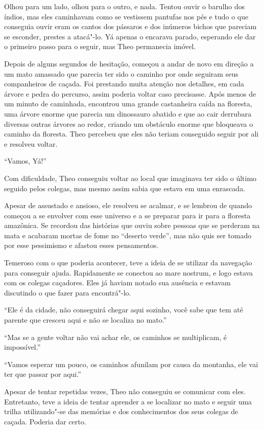 Olhou para um lado, olhou para o outro, e nada. Tentou ouvir o barulho
dos índios, mas eles caminhavam como se vestissem pantufas nos pés e
tudo o que conseguia ouvir eram os cantos dos pássaros e dos inúmeros
bichos que pareciam se esconder, prestes a atacá"-lo. Yá apenas o
encarava parado, esperando ele dar o primeiro passo para o seguir, mas
Theo permanecia imóvel.

Depois de alguns segundos de hesitação, começou a andar de novo em
direção a um mato amassado que parecia ter sido o caminho por onde
seguiram seus companheiros de caçada. Foi prestando muita atenção nos
detalhes, em cada árvore e pedra do percurso, assim poderia voltar caso
precisasse. Após menos de um minuto de caminhada, encontrou uma grande
castanheira caída na floresta, uma árvore enorme que parecia um
dinossauro abatido e que ao cair derrubara diversas outras árvores ao
redor, criando um obstáculo enorme que bloqueava o caminho da floresta.
Theo percebeu que eles não teriam conseguido seguir por ali e resolveu
voltar.

``Vamos, Yá!''

Com dificuldade, Theo conseguiu voltar ao local que imaginava ter sido o
último seguido pelos colegas, mas mesmo assim sabia que estava em uma
enrascada.

Apesar de assustado e ansioso, ele resolveu se acalmar, e se lembrou de
quando começou a se envolver com esse universo e a se preparar para ir
para a floresta amazônica. Se recordou das histórias que ouviu sobre
pessoas que se perderam na mata e acabaram mortas de fome no ``deserto
verde'', mas não quis ser tomado por esse pessimismo e afastou esses
pensamentos.

Temeroso com o que poderia acontecer, teve a ideia de se utilizar da
navegação para conseguir ajuda. Rapidamente se conectou ao mare nostrum,
e logo estava com os colegas caçadores. Eles já haviam notado sua
ausência e estavam discutindo o que fazer para encontrá"-lo.

``Ele é da cidade, não conseguirá chegar aqui sozinho, você sabe que tem
até parente que cresceu aqui e não se localiza no mato.''

``Mas se a gente voltar não vai achar ele, os caminhos se multiplicam, é
impossível.''

``Vamos esperar um pouco, os caminhos afunilam por causa da montanha,
ele vai ter que passar por aqui.''

Apesar de tentar repetidas vezes, Theo não conseguiu se comunicar com
eles. Entretanto, teve a ideia de tentar aprender a se localizar no mato
e seguir uma trilha utilizando"-se das memórias e dos conhecimentos dos
seus colegas de caçada. Poderia dar certo.

